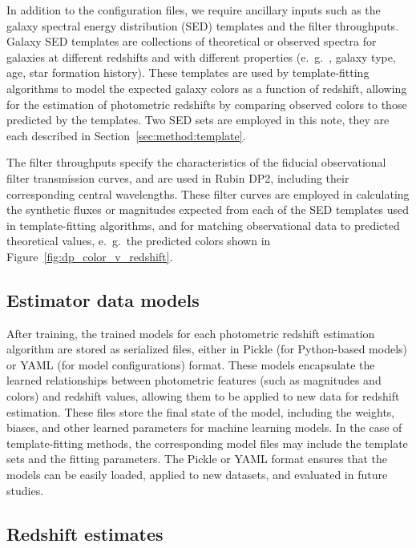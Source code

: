 In addition to the configuration files, we require ancillary inputs such as the galaxy spectral energy distribution (SED) templates and the filter throughputs.  Galaxy SED templates are collections of theoretical or observed spectra for galaxies at different redshifts and with different properties (e.~g.~, galaxy type, age, star formation history).  These templates are used by template-fitting algorithms to model the expected galaxy colors as a function of redshift, allowing for the estimation of photometric redshifts by comparing observed colors to those predicted by the templates.  Two SED sets are employed in this note, they are each described in Section~\ref{sec:method:template}.

The filter throughputs specify the characteristics of the fiducial observational filter transmission curves, and are used in Rubin DP2, including their corresponding central wavelengths.  These filter curves are employed in calculating the synthetic fluxes or magnitudes expected from each of the SED templates used in template-fitting algorithms, and for matching observational data to predicted theoretical values, e.~g.~the predicted colors shown in Figure~\ref{fig:dp_color_v_redshift}.


\subsection{Estimator data models}
\label{sec:products:models}


After training, the trained models for each photometric redshift estimation algorithm are stored as serialized files, either in Pickle (for Python-based models) or YAML (for model configurations) format.  These models encapsulate the learned relationships between photometric features (such as magnitudes and colors) and redshift values, allowing them to be applied to new data for redshift estimation.  These files store the final state of the model, including the weights, biases, and other learned parameters for machine learning models.  In the case of template-fitting methods, the corresponding model files may include the template sets and the fitting parameters.  The Pickle or YAML format ensures that the models can be easily loaded, applied to new datasets, and evaluated in future studies.


\subsection{Redshift estimates}
\label{sec:products:estimates}



